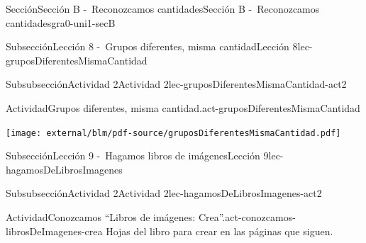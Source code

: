 \begin{sectionptx}{Sección}{Sección B -~Reconozcamos cantidades}{}{Sección B -~Reconozcamos cantidades}{}{}{gra0-uni1-secB}
\begin{subsectionptx}{Subsección}{Lección 8 -~Grupos diferentes, misma cantidad}{}{Lección 8}{}{}{lec-gruposDiferentesMismaCantidad}
\begin{subsubsectionptx}{Subsubsección}{Actividad 2}{}{Actividad 2}{}{}{lec-gruposDiferentesMismaCantidad-act2}
\begin{activity}{Actividad}{Grupos diferentes, misma cantidad.}{act-gruposDiferentesMismaCantidad}
\begin{cutoutpage}
\texttt{[image: external/blm/pdf-source/gruposDiferentesMismaCantidad.pdf]}
\cleardoublepage
\end{cutoutpage}
\end{activity}%
\end{subsubsectionptx}
\end{subsectionptx}
%
%
\typeout{************************************************}
\typeout{************************************************}
%
\begin{subsectionptx}{Subsección}{Lección 9 -~Hagamos libros de imágenes}{}{Lección 9}{}{}{lec-hagamosDeLibrosImagenes}
%
%
\typeout{************************************************}
\typeout{************************************************}
%
\begin{subsubsectionptx}{Subsubsección}{Actividad 2}{}{Actividad 2}{}{}{lec-hagamosDeLibrosImagenes-act2}
\begin{activity}{Actividad}{Conozcamos “Libros de imágenes: Crea”.}{act-conozcamos-librosDeImagenes-crea}%
Hojas del libro para crear en las páginas que siguen.
\end{activity}%
\clearpage

\end{subsubsectionptx}
\end{subsectionptx}
\end{sectionptx}
